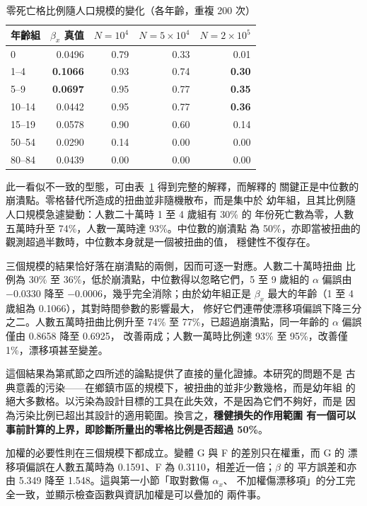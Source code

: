 \documentclass[UTF8, fontset=macnew, a4paper, 12pt]{ctexart}
\newcommand{\cn}[1]{\ding{\number\numexpr171+#1\relax}}
\begin{document}
\begin{table}[H]
\centering
\caption{零死亡格比例隨人口規模的變化（各年齡，重複 200 次）}
\small
\begin{tabular}{lrrrr}
\toprule
年齡組 & $\beta_x$ 真值 & $N=10^4$ & $N=5\times10^4$ & $N=2\times10^5$\\
\midrule
0       & 0.0496 & 0.79 & 0.33 & 0.01\\
1--4    & \textbf{0.1066} & 0.93 & 0.74 & \textbf{0.30}\\
5--9    & \textbf{0.0697} & 0.95 & 0.77 & \textbf{0.35}\\
10--14  & 0.0442 & 0.95 & 0.77 & \textbf{0.36}\\
15--19  & 0.0578 & 0.90 & 0.60 & 0.14\\
50--54  & 0.0290 & 0.14 & 0.00 & 0.00\\
80--84  & 0.0439 & 0.00 & 0.00 & 0.00\\
\bottomrule
\end{tabular}
\label{tab:zerorate}
\end{table}

此一看似不一致的型態，可由表~\ref{tab:zerorate} 得到完整的解釋，而解釋的
關鍵正是中位數的崩潰點。零格替代所造成的扭曲並非隨機散布，而是集中於
幼年組，且其比例隨人口規模急遽變動：人數二十萬時 1 至 4 歲組有 30\% 的
年份死亡數為零，人數五萬時升至 74\%，人數一萬時達 93\%。中位數的崩潰點
為 50\%，亦即當被扭曲的觀測超過半數時，中位數本身就是一個被扭曲的值，
穩健性不復存在。

三個規模的結果恰好落在崩潰點的兩側，因而可逐一對應。人數二十萬時扭曲
比例為 30\% 至 36\%，低於崩潰點，中位數得以忽略它們，5 至 9 歲組的
$\alpha$ 偏誤由 $-0.0330$ 降至 $-0.0006$，幾乎完全消除；由於幼年組正是
$\beta_x$ 最大的年齡（1 至 4 歲組為 0.1066），其對時間參數的影響最大，
修好它們連帶使漂移項偏誤下降三分之二。人數五萬時扭曲比例升至 74\% 至
77\%，已超過崩潰點，同一年齡的 $\alpha$ 偏誤僅由 0.8658 降至 0.6925，
改善兩成；人數一萬時比例達 93\% 至 95\%，改善僅 1\%，漂移項甚至變差。

這個結果為第貳節之四所述的論點提供了直接的量化證據。本研究的問題不是
古典意義的污染——在鄉鎮市區的規模下，被扭曲的並非少數幾格，而是幼年組
的絕大多數格。以污染為設計目標的工具在此失效，不是因為它們不夠好，而是
因為污染比例已超出其設計的適用範圍。換言之，\textbf{穩健損失的作用範圍
有一個可以事前計算的上界，即診斷\cn{2}所量出的零格比例是否超過 50\%}。

加權的必要性則在三個規模下都成立。變體 G 與 F 的差別只在權重，而 G 的
漂移項偏誤在人數五萬時為 0.1591、F 為 0.3110，相差近一倍；$\beta$ 的
平方誤差和亦由 5.349 降至 1.548。這與第一小節「取對數傷 $\alpha_x$、
不加權傷漂移項」的分工完全一致，並顯示檢查函數與資訊加權是可以疊加的
兩件事。
\end{document}
